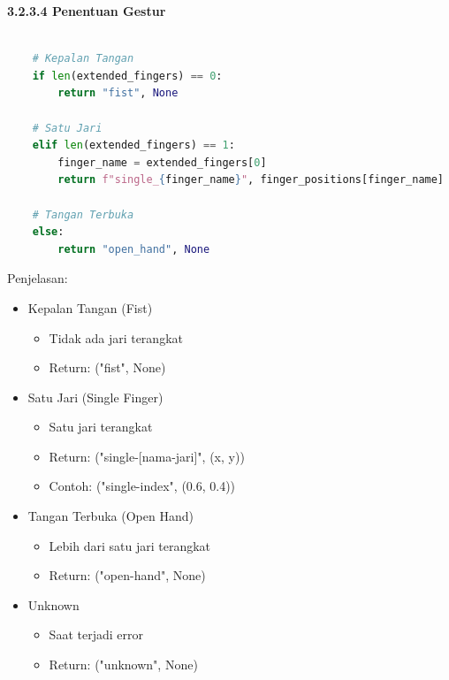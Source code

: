 \documentclass[11pt,a4paper]{article}
\begin{document}
    \noindent\textbf{3.2.3.4 Penentuan Gestur}
    \begin{lstlisting}[language=Python, caption=Penentuan Gestur]
        
    # Kepalan Tangan
    if len(extended_fingers) == 0:
        return "fist", None
    
    # Satu Jari
    elif len(extended_fingers) == 1:
        finger_name = extended_fingers[0]
        return f"single_{finger_name}", finger_positions[finger_name]
    
    # Tangan Terbuka
    else:
        return "open_hand", None
    \end{lstlisting}
    Penjelasan:
    \begin{itemize}
        \item Kepalan Tangan (Fist)
        \begin{itemize}
            \item Tidak ada jari terangkat
            \item Return: ("fist", None)
        \end{itemize}
        \item Satu Jari (Single Finger)
        \begin{itemize}
            \item Satu jari terangkat
            \item Return: ("single-[nama-jari]", (x, y))
            \item Contoh: ("single-index", (0.6, 0.4))
        \end{itemize}
        \item Tangan Terbuka (Open Hand)
        \begin{itemize}
            \item Lebih dari satu jari terangkat
            \item Return: ("open-hand", None)
        \end{itemize}
        \item Unknown
        \begin{itemize}
            \item Saat terjadi error
            \item Return: ("unknown", None)
        \end{itemize}
    \end{itemize}
\end{document}
